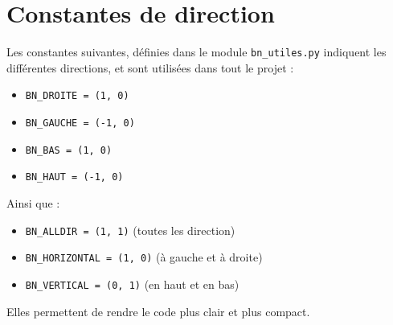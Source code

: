 \section{Constantes de direction}
Les constantes suivantes, définies dans le module \texttt{bn\_utiles.py} indiquent les différentes directions, et sont utilisées dans tout le projet :
\begin{itemize}
\item \texttt{BN\_DROITE = (1, 0)}
\item \texttt{BN\_GAUCHE = (-1, 0)}
\item \texttt{BN\_BAS = (1, 0)}
\item \texttt{BN\_HAUT = (-1, 0)}
\end{itemize}
Ainsi que :
\begin{itemize}
\item \texttt{BN\_ALLDIR = (1, 1)} (toutes les direction)
\item \texttt{BN\_HORIZONTAL = (1, 0)} (à gauche et à droite)
\item \texttt{BN\_VERTICAL = (0, 1)} (en haut et en bas)
\end{itemize}
Elles permettent de rendre le code plus clair et plus compact.